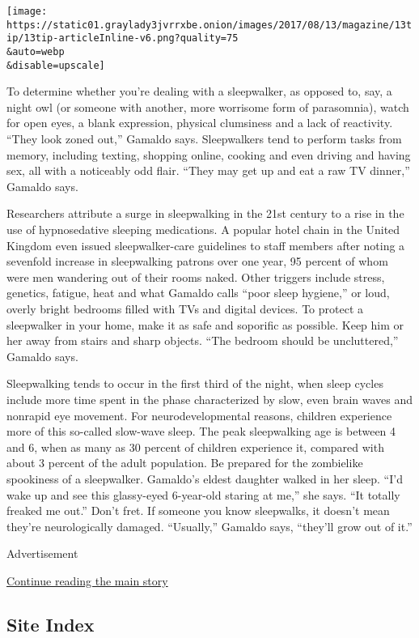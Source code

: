 \texttt{[image: https://static01.graylady3jvrrxbe.onion/images/2017/08/13/magazine/13tip/13tip-articleInline-v6.png?quality=75\\\&auto=webp\\\&disable=upscale]}

To determine whether you're dealing with a sleepwalker, as opposed to,
say, a night owl (or someone with another, more worrisome form of
parasomnia), watch for open eyes, a blank expression, physical
clumsiness and a lack of reactivity. ``They look zoned out,'' Gamaldo
says. Sleepwalkers tend to perform tasks from memory, including texting,
shopping online, cooking and even driving and having sex, all with a
noticeably odd flair. ``They may get up and eat a raw TV dinner,''
Gamaldo says.

Researchers attribute a surge in sleepwalking in the 21st century to a
rise in the use of hypnosedative sleeping medications. A popular hotel
chain in the United Kingdom even issued sleepwalker-care guidelines to
staff members after noting a sevenfold increase in sleepwalking patrons
over one year, 95 percent of whom were men wandering out of their rooms
naked. Other triggers include stress, genetics, fatigue, heat and what
Gamaldo calls ``poor sleep hygiene,'' or loud, overly bright bedrooms
filled with TVs and digital devices. To protect a sleepwalker in your
home, make it as safe and soporific as possible. Keep him or her away
from stairs and sharp objects. ``The bedroom should be uncluttered,''
Gamaldo says.

Sleepwalking tends to occur in the first third of the night, when sleep
cycles include more time spent in the phase characterized by slow, even
brain waves and nonrapid eye movement. For neurodevelopmental reasons,
children experience more of this so-called slow-wave sleep. The peak
sleepwalking age is between 4 and 6, when as many as 30 percent of
children experience it, compared with about 3 percent of the adult
population. Be prepared for the zombielike spookiness of a sleepwalker.
Gamaldo's eldest daughter walked in her sleep. ``I'd wake up and see
this glassy-eyed 6-year-old staring at me,'' she says. ``It totally
freaked me out.'' Don't fret. If someone you know sleepwalks, it doesn't
mean they're neurologically damaged. ``Usually,'' Gamaldo says,
``they'll grow out of it.''

Advertisement

\protect\hyperlink{after-bottom}{Continue reading the main story}

\hypertarget{site-index}{%
\subsection{Site Index}\label{site-index}}


